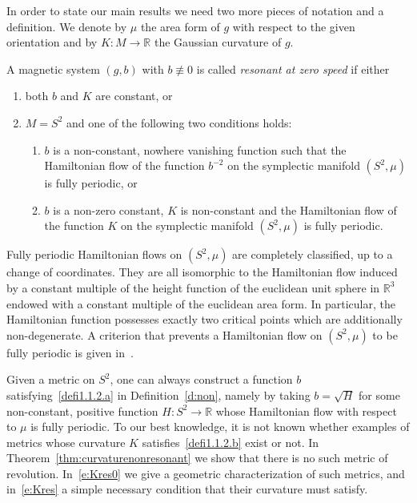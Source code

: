 \documentclass[AHL,Unicode,longabstracts,published]{cedram}
\newcommand{\R}{\mathbb{R}}
\begin{document}
In order to state our main results we need two more pieces of notation and a definition. We denote by $\mu$ the area form of $g$ with respect to the given orientation and by $K:M\to\R$ the Gaussian curvature of $g$.

\begin{defi}\label{d:non}
A magnetic system $(g,b)$ with $b\not\equiv 0$ is called \emph{resonant at zero speed} if either
\begin{enumerate}
\item\label{defi1.1.1} both $b$ and $K$ are constant, or
\item\label{defi1.1.2} $M=S^2$ and one of the following two conditions holds:
\begin{enumerate}
\item\label{defi1.1.2.a} $b$ is a non-constant, nowhere vanishing function such that the Hamiltonian flow of the function $b^{-2}$ on the symplectic manifold $(S^2,\mu)$ is fully periodic, or
\item\label{defi1.1.2.b} $b$ is a non-zero constant, $K$ is non-constant and the Hamiltonian flow of the function $K$ on the symplectic manifold $(S^2,\mu)$ is fully periodic.
\end{enumerate}
\end{enumerate}
\end{defi}

\begin{rema}
Fully periodic Hamiltonian flows on $(S^2,\mu)$ are completely classified, up to a change of coordinates. They are all isomorphic to the Hamiltonian flow induced by a constant multiple of the height function of the euclidean unit sphere in $\R^3$ endowed with a constant multiple of the euclidean area form. In particular, the Hamiltonian function possesses exactly two critical points which are additionally non-degenerate. A criterion that prevents a Hamiltonian flow on $(S^2,\mu)$ to be fully periodic is given in~\cite[Theorem~1.7]{AB21}.
\end{rema}

\begin{rema}
Given a metric on $S^2$, one can always construct a function $b$ satisfying~\eqref{defi1.1.2.a} in Definition~\ref{d:non}, namely by taking $b=\sqrt{H}$ for some non-constant, positive function $H:S^2\to\R$ whose Hamiltonian flow with respect to $\mu$ is fully periodic. To our best knowledge, it is not known whether examples of metrics whose curvature $K$ satisfies~\eqref{defi1.1.2.b} exist or not. In Theorem~\ref{thm:curvaturenonresonant} we show that there is no such metric of revolution. In~\eqref{e:Kres0} we give a geometric characterization of such metrics, and in~\eqref{e:Kres} a simple necessary condition that their curvature must satisfy.
\end{rema}
\end{document}
